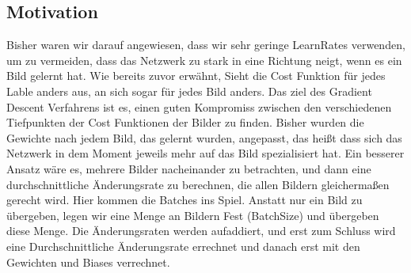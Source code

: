 \documentclass[12pt]{article}
\begin{document}
\subsection{ Motivation}
Bisher waren wir darauf angewiesen, dass wir sehr geringe LearnRates verwenden, um zu vermeiden, dass das Netzwerk zu stark in eine Richtung neigt, wenn es ein Bild gelernt hat. Wie bereits zuvor erwähnt, Sieht die Cost Funktion für jedes Lable anders aus, an sich sogar für jedes Bild anders. Das ziel des Gradient Descent Verfahrens ist es, einen guten Kompromiss zwischen den verschiedenen Tiefpunkten der Cost Funktionen der Bilder zu finden.
Bisher wurden die Gewichte nach jedem Bild, das gelernt wurden, angepasst, das heißt dass sich das Netzwerk in dem Moment jeweils mehr auf das Bild spezialisiert hat. Ein besserer Ansatz wäre es, mehrere Bilder nacheinander zu betrachten, und dann eine durchschnittliche Änderungsrate zu berechnen, die allen Bildern gleichermaßen gerecht wird. Hier kommen die Batches ins Spiel.
Anstatt nur ein Bild zu übergeben, legen wir eine Menge an Bildern Fest (BatchSize) und übergeben diese Menge. Die Änderungsraten werden aufaddiert, und erst zum Schluss wird eine Durchschnittliche Änderungsrate errechnet und danach erst mit den Gewichten und Biases verrechnet.
\end{document}
